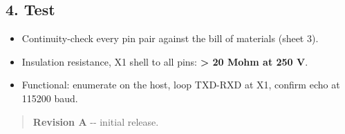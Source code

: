 \hypertarget{4-test}{%
\subsection{4. Test}\label{4-test}}

\begin{itemize}
\tightlist
\item
  Continuity-check every pin pair against the bill of materials (sheet 3).
\item
  Insulation resistance, X1 shell to all pins: \textbf{\textgreater{} 20 Mohm at 250 V}.
\item
  Functional: enumerate on the host, loop TXD-RXD at X1, confirm echo at 115200 baud.
\end{itemize}

\begin{quote}
\textbf{Revision A} -\/- initial release.
\end{quote}
